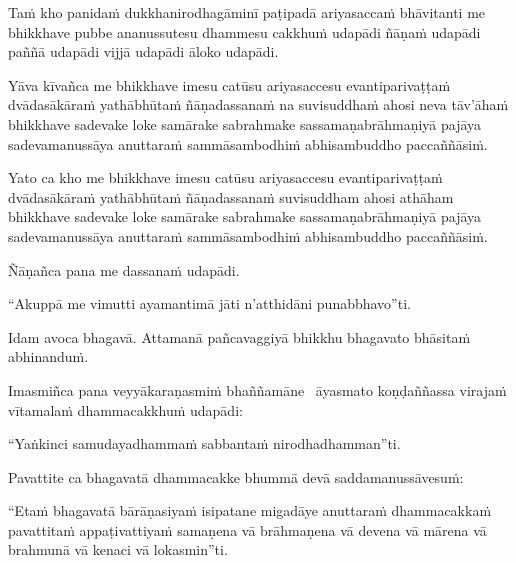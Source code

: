 \begin{pali-hang}
  Taṁ kho panidaṁ dukkhanirodhagāminī paṭipadā ariyasaccaṁ bhāvitanti me bhikkhave pubbe ananussutesu dhammesu cakkhuṁ udapādi ñāṇaṁ udapādi paññā udapādi vijjā udapādi āloko udapādi.
\end{pali-hang}

\begin{pali-hang}
  Yāva kīvañca me bhikkhave imesu catūsu ariyasaccesu evantiparivaṭṭaṁ dvādasākāraṁ yathābhūtaṁ ñāṇadassanaṁ na suvisuddhaṁ ahosi neva tāv'āhaṁ bhikkhave sadevake loke samārake sabrahmake sassamaṇabrāhmaṇiyā pajāya sadevamanussāya anuttaraṁ sammāsambodhiṁ abhisambuddho paccaññāsiṁ.
\end{pali-hang}

\begin{pali-hang}
  Yato ca kho me bhikkhave imesu catūsu ariyasaccesu evantiparivaṭṭaṁ dvādasākāraṁ yathābhūtaṁ ñāṇadassanaṁ suvisuddham ahosi athāham bhikkhave sadevake loke samārake sabrahmake sassamaṇabrāhmaṇiyā pajāya sadevamanussāya anuttaraṁ sammāsambodhiṁ abhisambuddho paccaññāsiṁ.
\end{pali-hang}

Ñāṇañca pana me dassanaṁ udapādi.

\begin{pali-hang}
  ``Akuppā me vimutti ayamantimā jāti n'atthidāni punabbhavo''ti.
\end{pali-hang}

\begin{pali-hang}
  Idam avoca bhagavā. Attamanā pañcavaggiyā bhikkhu bhagavato bhāsitaṁ abhinanduṁ.
\end{pali-hang}

\begin{pali-hang}
  Imasmiñca pana veyyākaraṇasmiṁ bhaññamāne \breathmark\ āyasmato koṇḍaññassa virajaṁ vītamalaṁ dhammacakkhuṁ udapādi:
\end{pali-hang}

``Yaṅkinci samudayadhammaṁ sabbantaṁ nirodhadhamman''ti.

\begin{pali-hang}
  Pavattite ca bhagavatā dhammacakke bhummā devā saddamanussāvesuṁ:
\end{pali-hang}

\begin{pali-hang}
  ``Etaṁ bhagavatā bārāṇasiyaṁ isipatane migadāye anuttaraṁ dhammacakkaṁ pavattitaṁ appaṭivattiyaṁ samaṇena vā brāhmaṇena vā devena vā mārena vā brahmunā vā kenaci vā lokasmin''ti.
\end{pali-hang}

